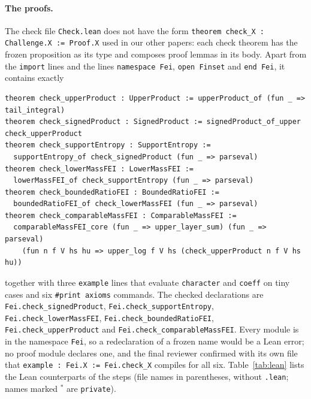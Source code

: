 \documentclass[11pt]{article}
\theoremstyle{definition}
\theoremstyle{remark}
\begin{document}
{\paragraph{The proofs.} The check file \texttt{Check.lean} does not have the
form \texttt{theorem check\_X : Challenge.X := Proof.X} used in our other
papers: each check theorem has the frozen proposition as its type and composes
proof lemmas in its body. Apart from the \texttt{import} lines and the lines
\texttt{namespace Fei}, \texttt{open Finset} and \texttt{end Fei}, it contains
exactly
{\footnotesize
\begin{verbatim}
theorem check_upperProduct : UpperProduct := upperProduct_of (fun _ => tail_integral)
theorem check_signedProduct : SignedProduct := signedProduct_of_upper check_upperProduct
theorem check_supportEntropy : SupportEntropy :=
  supportEntropy_of check_signedProduct (fun _ => parseval)
theorem check_lowerMassFEI : LowerMassFEI :=
  lowerMassFEI_of check_supportEntropy (fun _ => parseval)
theorem check_boundedRatioFEI : BoundedRatioFEI :=
  boundedRatioFEI_of check_lowerMassFEI (fun _ => parseval)
theorem check_comparableMassFEI : ComparableMassFEI :=
  comparableMassFEI_core (fun _ => upper_layer_sum) (fun _ => parseval)
    (fun n f V hs hu => upper_log f V hs (check_upperProduct n f V hs hu))
\end{verbatim}}
\noindent together with three \texttt{example} lines that evaluate
\texttt{character} and \texttt{coeff} on tiny cases and six \texttt{\#print
axioms} commands. The checked declarations are
\texttt{Fei.check\_signedProduct}, \texttt{Fei.check\_supportEntropy},
\texttt{Fei.check\_lowerMassFEI}, \texttt{Fei.check\_boundedRatioFEI},
\texttt{Fei.check\_upperProduct} and \texttt{Fei.check\_comparableMassFEI}.
Every module is in the namespace \texttt{Fei}, so a redeclaration of a frozen
name would be a Lean error; no proof module declares one, and the final
reviewer confirmed with its own file that
\texttt{example : Fei.X := Fei.check\_X} compiles for all six. Table~\ref{tab:lean}
lists the Lean counterparts of the steps (file names in parentheses, without
\texttt{.lean}; names marked $^*$ are \texttt{private}).

}
\end{document}
